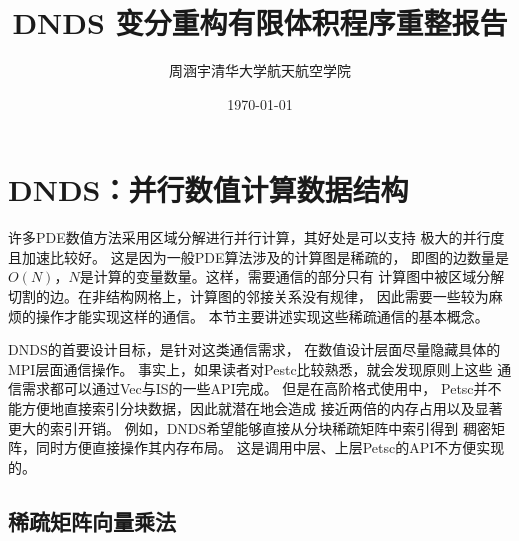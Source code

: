 \documentclass[UTF8,zihao=5]{ctexart} %
\title{{\bfseries\rmfamily\Huge{DNDS 变分重构有限体积程序重整报告}}}
\author{周涵宇\hspace{2em}清华大学航天航空学院}
\date{\today}
\begin{document}
\maketitle
\thispagestyle{empty}
\newpage

\begin{center}
    \rmfamily
    \tableofcontents\setcounter{page}{0}
\end{center}
\thispagestyle{empty}
\newpage



\section{DNDS：并行数值计算数据结构}

许多PDE数值方法采用区域分解进行并行计算，其好处是可以支持
极大的并行度且加速比较好。
这是因为一般PDE算法涉及的计算图是稀疏的，
即图的边数量是$O(N)$，$N$是计算的变量数量。这样，需要通信的部分只有
计算图中被区域分解切割的边。在非结构网格上，计算图的邻接关系没有规律，
因此需要一些较为麻烦的操作才能实现这样的通信。
本节主要讲述实现这些稀疏通信的基本概念。

DNDS的首要设计目标，是针对这类通信需求，
在数值设计层面尽量隐藏具体的MPI层面通信操作。
事实上，如果读者对Pestc比较熟悉，就会发现原则上这些
通信需求都可以通过Vec与IS的一些API完成。
但是在高阶格式使用中，
Petsc并不能方便地直接索引分块数据，因此就潜在地会造成
接近两倍的内存占用以及显著更大的索引开销。
例如，DNDS希望能够直接从分块稀疏矩阵中索引得到
稠密矩阵，同时方便直接操作其内存布局。
这是调用中层、上层Petsc的API不方便实现的。




\subsection{稀疏矩阵向量乘法}
\label{ssec:sparse_mat}
\end{document}
